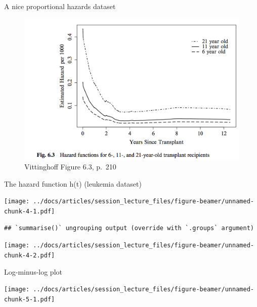 \documentclass[
  ignorenonframetext,
]{beamer}
\begin{document}
\begin{frame}{A nice proportional hazards dataset}
\protect\hypertarget{a-nice-proportional-hazards-dataset}{}

\begin{figure}
\centering
\includegraphics{figures/vittinghofffig63.png}
\caption{Vittinghoff Figure 6.3, p.~210}
\end{figure}

\end{frame}

\begin{frame}[fragile]{The hazard function h(t) (leukemia dataset)}
\protect\hypertarget{the-hazard-function-ht-leukemia-dataset}{}

\texttt{[image: ../docs/articles/session\_lecture\_files/figure-beamer/unnamed-chunk-4-1.pdf]}

\begin{verbatim}
## `summarise()` ungrouping output (override with `.groups` argument)
\end{verbatim}

\texttt{[image: ../docs/articles/session\_lecture\_files/figure-beamer/unnamed-chunk-4-2.pdf]}

\end{frame}

\begin{frame}{Log-minus-log plot}
\protect\hypertarget{log-minus-log-plot}{}

\texttt{[image: ../docs/articles/session\_lecture\_files/figure-beamer/unnamed-chunk-5-1.pdf]}

\end{frame}
\end{document}
